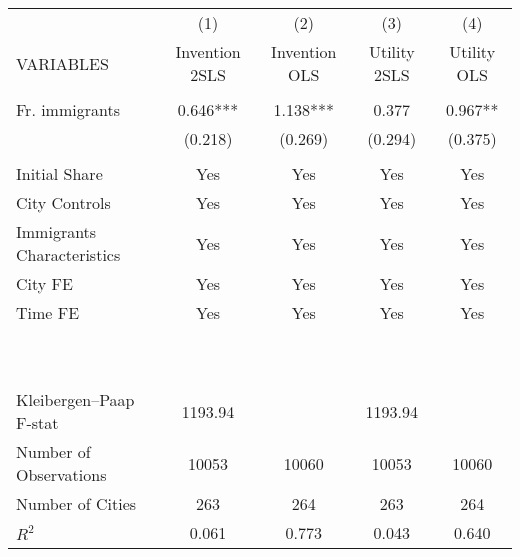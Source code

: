 \begin{tabular}{lcccc} \hline
 & (1) & (2) & (3) & (4) \\
VARIABLES & Invention 2SLS & Invention OLS & Utility 2SLS & Utility OLS \\ \hline
 &  &  &  &  \\
Fr. immigrants & 0.646*** & 1.138*** & 0.377 & 0.967** \\
 & (0.218) & (0.269) & (0.294) & (0.375) \\
 &  &  &  &  \\
Initial Share & Yes & Yes & Yes & Yes \\
City Controls & Yes & Yes & Yes & Yes \\
Immigrants Characteristics & Yes & Yes & Yes & Yes \\
City FE & Yes & Yes & Yes & Yes \\
Time FE & Yes & Yes & Yes & Yes \\
~ & ~ & ~ & ~ & ~ \\
~ & ~ & ~ & ~ & ~ \\
Kleibergen–Paap F-stat & 1193.94 &  & 1193.94 &  \\
Number of Observations & 10053 & 10060 & 10053 & 10060 \\
Number of Cities & 263 & 264 & 263 & 264 \\
 $ R^2$ & 0.061 & 0.773 & 0.043 & 0.640 \\ \hline
\end{tabular}
